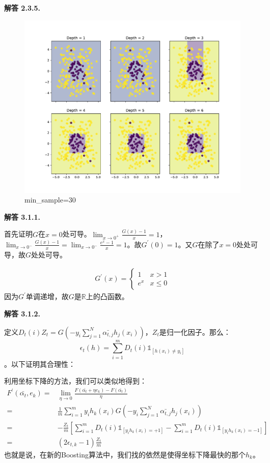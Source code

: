 \documentclass[12pt, a4paper, oneside]{ctexart}
\newenvironment{solution}[1]{\par\noindent\textbf{解答 #1. }\par}{\par}
\begin{document}
\begin{solution}{2.3.5}
    \begin{figure}[htbp]
        \centering
        \includegraphics[width=.9\textwidth]{pdf/1.pdf}
        \caption{min\_sample=30}
    \end{figure}

\end{solution}

\begin{solution}{3.1.1}
    首先证明$G$在$x=0$处可导。$\lim_{x\to0^+}\frac{G(x)-1}{x}=1$，$\lim_{x\to0^-}\frac{G(x)-1}{x}=\lim_{x\to0^-}\frac{e^x-1}{x}=1$。故$G^\prime(0)=1$。又$G$在除了$x=0$处处可导，故$G$处处可导。\par
    \begin{align}
        G^\prime(x) = 
        \begin{cases}
            1 & x>1\\
            e^x & x\le0
        \end{cases}
        \nonumber
    \end{align}
    因为$G^\prime$单调递增，故$G$是$\mathbb{R}$上的凸函数。
\end{solution}

\begin{solution}{3.1.2}
    定义$D_t(i)Z_t=G(-y_i\sum_{j=1}^{N}\bar{\alpha_{t,j}} h_j(x_i))$，$Z_t$是归一化因子。那么：
    $$
    \epsilon_t(h)=\sum_{i=1}^{m}D_t(i)\mathds{1}_{\left[ h(x_i)\neq y_i\right]}
    $$。以下证明其合理性：\par
    利用坐标下降的方法，我们可以类似地得到：
    \begin{align}
        F^\prime(\bar{\alpha_{t}}, e_k)=&\lim_{\eta\to0}\frac{F(\bar{\alpha_{t}}+\eta e_k)-F(\bar{\alpha_{t}})}{\eta}\nonumber \\
        =&\frac{1}{m}\sum_{i=1}^{m}y_i h_k(x_i)G(-y_i \sum_{j=1}^{N}\bar{\alpha_{t,j}} h_j(x_i))\nonumber \\
        =& -\frac{Z_t}{m}\left[ \sum_{i=1}^{m} D_t(i)\mathds{1}_{\left[ y_i h_k(x_i)=+1 \right]} - \sum_{i=1}^{m} D_t(i)\mathds{1}_{\left[ y_i h_k(x_i)=-1 \right]} \right]\nonumber \\
        =& (2\epsilon_{t, k}-1)\frac{Z_t}{m}\nonumber
    \end{align}
    也就是说，在新的Boosting算法中，我们找的依然是使得坐标下降最快的那个$h_k$。
\end{solution}
\end{document}
